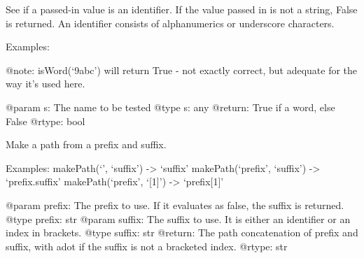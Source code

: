 \documentclass[a4paper,10pt,english]{sphinxmanual}
\begin{document}

\begin{fulllineitems}
\label{\detokenize{commands/apidoc/src:src.pyconf.isWord}}
See if a passed-in value is an identifier. If the value passed in is not a
string, False is returned. An identifier consists of alphanumerics or
underscore characters.

Examples:

%
\begin{sphinxVerbatim}[commandchars=\\\{\}]
 
  
  
 
\end{sphinxVerbatim}

@note: isWord(‘9abc’) will return True - not exactly correct, but adequate
for the way it’s used here.

@param s: The name to be tested
@type s: any
@return: True if a word, else False
@rtype: bool

\end{fulllineitems}


\begin{fulllineitems}
\label{\detokenize{commands/apidoc/src:src.pyconf.makePath}}
Make a path from a prefix and suffix.

Examples:
makePath(‘’, ‘suffix’) -\textgreater{} ‘suffix’
makePath(‘prefix’, ‘suffix’) -\textgreater{} ‘prefix.suffix’
makePath(‘prefix’, ‘{[}1{]}’) -\textgreater{} ‘prefix{[}1{]}’

@param prefix: The prefix to use. If it evaluates as false, the suffix is returned.
@type prefix: str
@param suffix: The suffix to use. It is either an identifier or an index in brackets.
@type suffix: str
@return: The path concatenation of prefix and suffix, with adot if the suffix is not a bracketed index.
@rtype: str

\end{fulllineitems}
\end{document}
